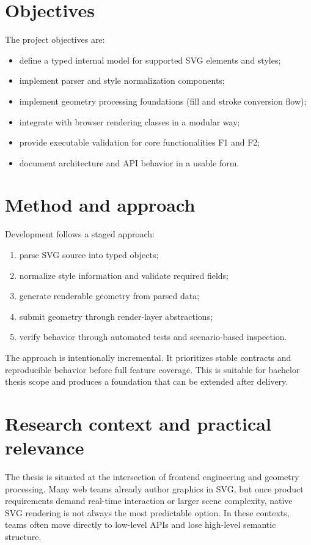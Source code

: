 \section{Objectives}

The project objectives are:

\begin{itemize}
\item define a typed internal model for supported SVG elements and styles;
\item implement parser and style normalization components;
\item implement geometry processing foundations (fill and stroke conversion flow);
\item integrate with browser rendering classes in a modular way;
\item provide executable validation for core functionalities F1 and F2;
\item document architecture and API behavior in a usable form.
\end{itemize}

\section{Method and approach}

Development follows a staged approach:

\begin{enumerate}
\item parse SVG source into typed objects;
\item normalize style information and validate required fields;
\item generate renderable geometry from parsed data;
\item submit geometry through render-layer abstractions;
\item verify behavior through automated tests and scenario-based inspection.
\end{enumerate}

The approach is intentionally incremental.
It prioritizes stable contracts and reproducible behavior before full feature coverage.
This is suitable for bachelor thesis scope and produces a foundation that can be extended after delivery.

\section{Research context and practical relevance}

The thesis is situated at the intersection of frontend engineering and geometry processing.
Many web teams already author graphics in SVG, but once product requirements demand real-time interaction or larger scene complexity, native SVG rendering is not always the most predictable option.
In these contexts, teams often move directly to low-level APIs and lose high-level semantic structure.


